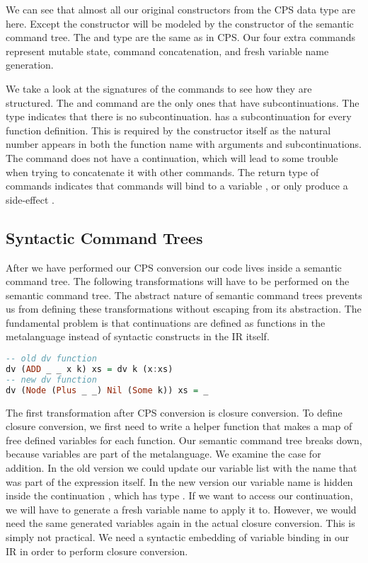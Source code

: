 We can see that almost all our original constructors from the \ac{CPS} data type are here. Except the  constructor will be modeled by the  constructor of the semantic command tree. The  and  type are the same as in \ac{CPS}. Our four extra commands represent mutable state, command concatenation, and fresh variable name generation.

We take a look at the signatures of the commands to see how they are structured. The  and  command are the only ones that have subcontinuations. The  type indicates that there is no subcontinuation.  has a subcontinuation for every function definition. This is required by the constructor itself as the natural number  appears in both the function name with arguments and subcontinuations. The  command does not have a continuation, which will lead to some trouble when trying to concatenate it with other commands. The return type of commands indicates that commands will bind to a variable , or only produce a side-effect \icode{()}.

\subsection{\label{subsection:syntree}Syntactic Command Trees}
After we have performed our \ac{CPS} conversion our code lives inside a semantic command tree. The following transformations will have to be performed on the semantic command tree. The abstract nature of semantic command trees prevents us from defining these transformations without escaping from its abstraction. The fundamental problem is that continuations are defined as functions in the metalanguage instead of syntactic constructs in the \ac{IR} itself.

\begin{lstlisting}[language=Haskell]
-- old dv function
dv (ADD _ _ x k) xs = dv k (x:xs)
-- new dv function
dv (Node (Plus _ _) Nil (Some k)) xs = _
\end{lstlisting}

The first transformation after \ac{CPS} conversion is closure conversion. To define closure conversion, we first need to write a helper function  that makes a map of free defined variables for each function. Our semantic command tree breaks down, because variables are part of the metalanguage. We examine the case for addition. In the old version we could update our variable list with the name  that was part of the  expression itself. In the new version our variable name is hidden inside the continuation , which has type . If we want to access our continuation, we will have to generate a fresh variable name to apply it to. However, we would need the same generated variables again in the actual closure conversion. This is simply not practical. We need a syntactic embedding of variable binding in our \ac{IR} in order to perform closure conversion.

